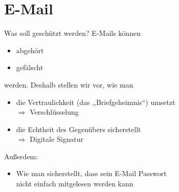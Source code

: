 \section{E-Mail}
\begin{frame}{Was soll geschützt werden?}
  E-Mails können
  \begin{itemize}
    \item abgehört
    \item gefälscht
  \end{itemize}
  werden. Deshalb stellen wir vor, wie man
  \begin{itemize}
    \item die Vertraulichkeit (das ,,Briefgeheimnis``) umsetzt
    \\ $\Rightarrow$ Verschlüsselung
    \item die Echtheit des Gegenübers sicherstellt
    \\ $\Rightarrow$ Digitale Signatur
  \end{itemize}
  Außerdem:
  \begin{itemize}
    \item Wie man sicherstellt, dass sein E-Mail Passwort\\ nicht einfach mitgelesen werden kann
  \end{itemize}
\end{frame}

\renewcommand{\emailtext}{Von: Alice@provider1.de\\An: Bob@provider2.com\\Betreff: Hallo\\Hallo Bob, wie gehts dir?\\LG Alice}
\renewcommand{\emailciphertext}{Von: Alice@provider1.de\\An: Bob@provider2.com\\Betreff: Hallo\\\colorbox{blue}{\parbox[t][1.2em][t]{.88\messagewidth}{~}}}
\settowidth{\messagewidth}{\tiny Hallo Bob, wie gehts dir?}

